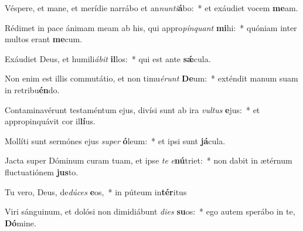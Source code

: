 \item Véspere, et mane, et merídie narrábo et an\textit{nun}\textit{ti}\textbf{á}bo:~* et exáudiet vocem \textbf{me}am.
\item Rédimet in pace ánimam meam ab his, qui appro\textit{pín}\textit{quant} \textbf{mi}hi:~* quóniam inter multos erant \textbf{me}cum.
\item Exáudiet Deus, et humili\textit{á}\textit{bit} \textbf{il}los:~* qui est ante \textbf{sǽ}cula.
\item Non enim est illis commutátio, et non timu\textit{é}\textit{runt} \textbf{De}um:~* exténdit manum suam in retribu\textbf{én}do.
\item Contaminavérunt testaméntum ejus, divísi sunt ab ira \textit{vul}\textit{tus} \textbf{e}jus:~* et appropinquávit cor il\textbf{lí}us.
\item Mollíti sunt sermónes ejus \textit{su}\textit{per} \textbf{ó}leum:~* et ipsi sunt \textbf{já}cula.
\item Jacta super Dóminum curam tuam, et ipse \textit{te} \textit{e}\textbf{nú}triet:~* non dabit in ætérnum fluctuatiónem \textbf{jus}to.
\item Tu vero, Deus, de\textit{dú}\textit{ces} \textbf{e}os,~* in púteum in\textbf{tér}itus
\item Viri sánguinum, et dolósi non dimidiábunt \textit{di}\textit{es} \textbf{su}os:~* ego autem sperábo in te, \textbf{Dó}mine.
